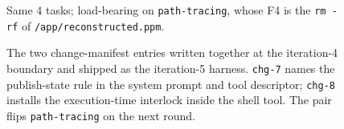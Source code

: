 \begin{figure}[t]
\begin{tcbraster}
\begin{tcolorbox}[colback=aheTeal!12,colframe=aheBlue,colbacktitle=aheBlue,
                          title={\scriptsize\textbf{chg-8, iteration 5, commit \texttt{4e0aab9}, level: tool implementation}}]
            Same 4 tasks; load-bearing on \texttt{path-tracing}, whose F4 is the \texttt{rm -rf} of \texttt{/app/reconstructed.ppm}.
        \end{tcolorbox}
    \end{tcbraster}
    \caption{The two change-manifest entries written together at the iteration-4 boundary and shipped as the iteration-5 harness. \texttt{chg-7} names the publish-state rule in the system prompt and tool descriptor; \texttt{chg-8} installs the execution-time interlock inside the shell tool. The pair flips \texttt{path-tracing} on the next round.}
    \label{fig:manifest-publish-state}
\end{figure}
